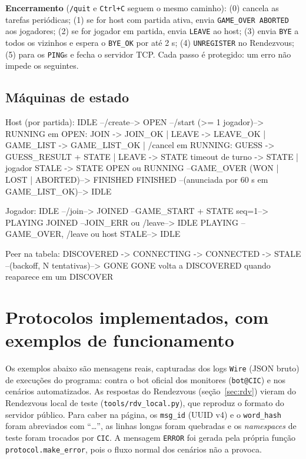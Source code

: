 \documentclass[11pt,a4paper]{article}
\begin{document}
\textbf{Encerramento} (\texttt{/quit} e \texttt{Ctrl+C} seguem o mesmo caminho): (0) cancela as tarefas periódicas; (1) se for host com partida ativa, envia \texttt{GAME\_OVER ABORTED} aos jogadores; (2) se for jogador em partida, envia \texttt{LEAVE} ao host; (3) envia \texttt{BYE} a todos os vizinhos e espera o \texttt{BYE\_OK} por até 2 s; (4) \texttt{UNREGISTER} no Rendezvous; (5) para os \texttt{PING}s e fecha o servidor TCP. Cada passo é protegido: um erro não impede os seguintes.

\subsection{Máquinas de estado}
\begin{codigo}
Host (por partida):
  IDLE --/create--> OPEN --/start (>= 1 jogador)--> RUNNING
  em OPEN:    JOIN -> JOIN_OK | LEAVE -> LEAVE_OK | GAME_LIST -> GAME_LIST_OK | /cancel
  em RUNNING: GUESS -> GUESS_RESULT + STATE | LEAVE -> STATE
              timeout de turno -> STATE | jogador STALE -> STATE
  OPEN ou RUNNING --GAME_OVER (WON | LOST | ABORTED)--> FINISHED
  FINISHED --(anunciada por 60 s em GAME_LIST_OK)--> IDLE

Jogador:
  IDLE --/join--> JOINED --GAME_START + STATE seq=1--> PLAYING
  JOINED --JOIN_ERR ou /leave--> IDLE
  PLAYING --GAME_OVER, /leave ou host STALE--> IDLE

Peer na tabela:
  DISCOVERED -> CONNECTING -> CONNECTED -> STALE --(backoff, N tentativas)--> GONE
  GONE volta a DISCOVERED quando reaparece em um DISCOVER
\end{codigo}

\section{Protocolos implementados, com exemplos de funcionamento}
{\small Os exemplos abaixo são mensagens reais, capturadas dos logs \texttt{Wire} (JSON bruto) de execuções do programa: contra o bot oficial dos monitores (\texttt{bot@CIC}) e nos cenários automatizados. As respostas do Rendezvous (seção~\ref{sec:rdv}) vieram do Rendezvous local de teste (\texttt{tools/rdv\_local.py}), que reproduz o formato do servidor público. Para caber na página, os \texttt{msg\_id} (UUID v4) e o \texttt{word\_hash} foram abreviados com ``\dots'', as linhas longas foram quebradas e os \emph{namespaces} de teste foram trocados por \texttt{CIC}. A mensagem \texttt{ERROR} foi gerada pela própria função \texttt{protocol.make\_error}, pois o fluxo normal dos cenários não a provoca.}
\end{document}
